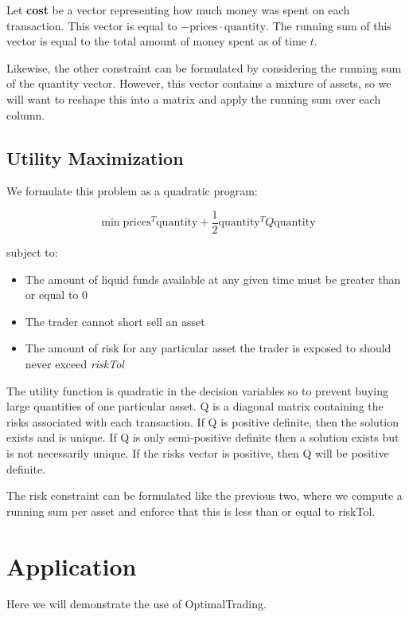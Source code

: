 \documentclass{article}
\begin{document}
Let \textbf{cost} be a vector representing how much money was spent on each
transaction.  This vector is equal to $-\mathrm{prices} \cdot \mathrm{quantity}$.  The running
sum of this vector is equal to the total amount of money spent as of time $t$.  

Likewise, the other constraint can be formulated by considering the running
sum of the quantity vector.  However, this vector contains a mixture of assets,
so we will want to reshape this into a matrix and apply the running sum over each
column.

\subsection{Utility Maximization}

We formulate this problem as a quadratic program:

$$\min {\mathrm{prices}^T \mathrm{quantity} + \frac{1}{2} \mathrm{quantity}^T Q \mathrm{quantity}}$$

subject to:

\begin{itemize}
  \item The amount of liquid funds available at any given time must be greater
    than or equal to 0
  \item The trader cannot short sell an asset
  \item The amount of risk for any particular asset the trader is exposed to 
    should never exceed \textit{riskTol}
\end{itemize}

The utility function is quadratic in the decision variables so to prevent 
buying large quantities of one particular asset.  Q is a diagonal matrix 
containing the risks associated with each transaction.  If Q is positive
definite, then the solution exists and is unique.  If Q is only semi-positive
definite then a solution exists but is not necessarily unique.  If the risks
vector is positive, then Q will be positive definite.  

The risk constraint can be formulated like the previous two, where we compute a
running sum per asset and enforce that this is less than or equal to riskTol.

\section{Application}

Here we will demonstrate the use of OptimalTrading.
\end{document}
